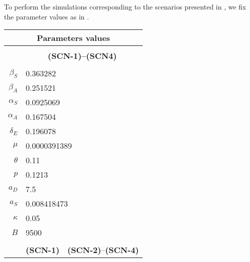     To perform the simulations corresponding to the scenarios presented in
, we fix the parameter values as in
.
%
\begin{table*}[tbh]
    \begin{center}
        \begin{tabular}{rc@{}c}
            \toprule
            \multicolumn{3}{c}{\textbf{Parameters values}}
            \\
            \midrule
            \\
                & \multicolumn{2}{c}{\textbf{(SCN-1)--(SCN4)}}
                \\
                \cmidrule{2-3}
                \\
                $\beta_S$
                & \multicolumn{2}{l}{\num{0.363282}}
            \\
                $\beta_A$
                & \multicolumn{2}{l}{\num{0.251521}}
            \\
                $\alpha_{S}$
                & \multicolumn{2}{l}{\num{0.0925069}}
            \\
                $\alpha_{A}$
                & \multicolumn{2}{l}{\num{0.167504}}
            \\
                $\delta_{E}$
                & \multicolumn{2}{l}{\num{0.196078}}
            \\
                $\mu$
                &\multicolumn{2}{l}{\num{0.0000391389}}
            \\
                $\theta$
                & \multicolumn{2}{l}{\num{0.11}}
            \\
                $p$
                & \multicolumn{2}{l}{\num{0.1213}}
            \\
                $a_D$
                & \multicolumn{2}{l}{\num{7.5}}
            \\
                $a_S$
                & \multicolumn{2}{l}{\num{0.008418473}}
            \\
                $\kappa$
                & \multicolumn{2}{l}{\num{0.05}}
            \\
                $B$
                & \multicolumn{2}{l}{\num{9500}}
            \\
            \\
                & \textbf{(SCN-1)}
                & \textbf{(SCN-2)}--\textbf{(SCN-4)}
            \\
                \cmidrule{2-3}

\end{tabular}
\end{center}
\end{table*}
